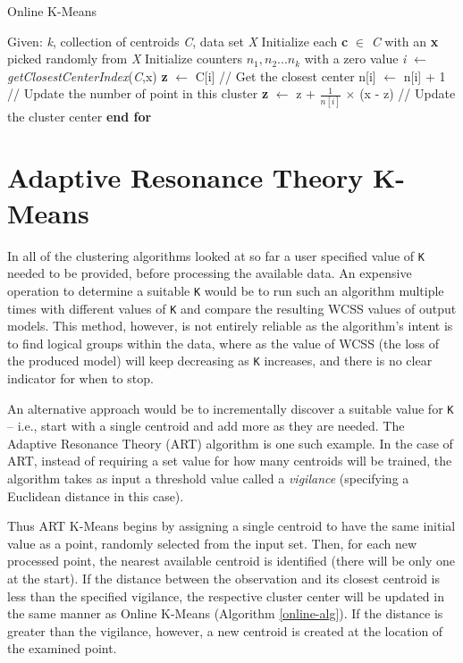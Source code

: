 \documentclass{l4proj}
\begin{document}
\begin{algorithm}
\caption{Online K-Means}\label{online-alg}
\begin{algorithmic}[1]
\State Given: \textit{k}, collection of centroids \textit{C}, data set \textit{X}
\State Initialize each \textbf{c} $\in$ \textit{C} with an \textbf{x} picked randomly from \textit{X}
\State Initialize counters $n_{1}, n_{2} ... n_{k}$ with a zero value
    \State \textit{i}  $\gets$ \textit{getClosestCenterIndex}(\textit{C},x)
    \State \textbf{z}  $\gets$ C[i] \hspace{2.25cm} // Get the closest center
    \State n[i] $\gets$ n[i] + 1 \hspace{1.3cm} // Update the number of point in this cluster
    \State \textbf{z} $\gets$ z + $\frac{1}{n[i]}$ $\times$ (x - z) \hspace{0.35cm} // Update the cluster center
\EndFor
\State \textbf{end for}
\end{algorithmic}
\end{algorithm}

\section{Adaptive Resonance Theory K-Means}

In all of the clustering algorithms looked at so far a user specified value of \texttt{K} needed to be provided, before processing the available data. An expensive operation to determine a suitable \texttt{K} would be to run such an algorithm multiple times with different values of \texttt{K} and compare the resulting WCSS values of output models. This method, however, is not entirely reliable as the algorithm's intent is to find logical groups within the data, where as the value of WCSS (the loss of the produced model) will keep decreasing as \texttt{K} increases, and there is no clear indicator for when to stop\cite{LearnK}.

An alternative approach would be to incrementally discover a suitable value for \texttt{K} -- i.e., start with a single centroid and add more as they are needed. The Adaptive Resonance Theory (ART) algorithm\cite{ART} is one such example. In the case of ART, instead of requiring a set value for how many centroids will be trained, the algorithm takes as input a threshold value called a \textit{vigilance} (specifying a Euclidean distance in this case). 

Thus ART K-Means begins by assigning a single centroid to have the same initial value as a point, randomly selected from the input set. Then, for each new processed point, the nearest available centroid is identified (there will be only one at the start). If the distance between the observation and its closest centroid is less than the specified vigilance, the respective cluster center will be updated in the same manner as Online K-Means (Algorithm \ref{online-alg}). If the distance is greater than the vigilance, however, a new centroid is created at the location of the examined point.
\end{document}
